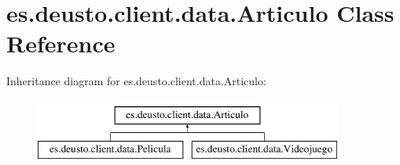 \hypertarget{classes_1_1deusto_1_1client_1_1data_1_1_articulo}{}\section{es.\+deusto.\+client.\+data.\+Articulo Class Reference}
\label{classes_1_1deusto_1_1client_1_1data_1_1_articulo}
Inheritance diagram for es.\+deusto.\+client.\+data.\+Articulo\+:\begin{figure}[H]
\begin{center}
\leavevmode
\includegraphics[height=2.000000cm]{classes_1_1deusto_1_1client_1_1data_1_1_articulo}
\end{center}
\end{figure}
